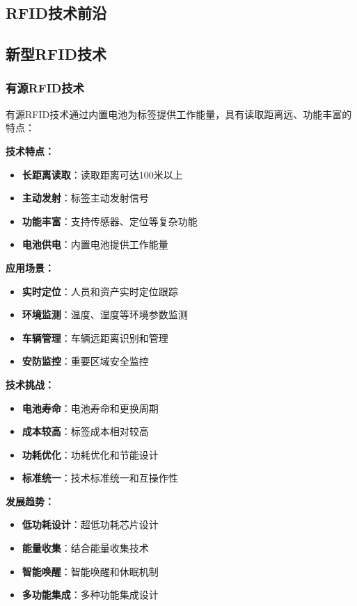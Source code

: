 \documentclass[12pt,UTF8]{ctexbook}
\begin{document}
\begin{itemize}[leftmargin=3.5em]
\begin{itemize}[leftmargin=3.5em]
\begin{itemize}[leftmargin=3.5em]
\begin{itemize}[leftmargin=3.5em]
\part{RFID技术前沿}

\chapter{新型RFID技术}

\section{有源RFID技术}

有源RFID技术通过内置电池为标签提供工作能量，具有读取距离远、功能丰富的特点：

\textbf{技术特点：}
\begin{itemize}[leftmargin=3.5em]
    \item \textbf{长距离读取}：读取距离可达100米以上
    \item \textbf{主动发射}：标签主动发射信号
    \item \textbf{功能丰富}：支持传感器、定位等复杂功能
    \item \textbf{电池供电}：内置电池提供工作能量
\end{itemize}

\textbf{应用场景：}
\begin{itemize}[leftmargin=3.5em]
    \item \textbf{实时定位}：人员和资产实时定位跟踪
    \item \textbf{环境监测}：温度、湿度等环境参数监测
    \item \textbf{车辆管理}：车辆远距离识别和管理
    \item \textbf{安防监控}：重要区域安全监控
\end{itemize}

\textbf{技术挑战：}
\begin{itemize}[leftmargin=3.5em]
    \item \textbf{电池寿命}：电池寿命和更换周期
    \item \textbf{成本较高}：标签成本相对较高
    \item \textbf{功耗优化}：功耗优化和节能设计
    \item \textbf{标准统一}：技术标准统一和互操作性
\end{itemize}

\textbf{发展趋势：}
\begin{itemize}[leftmargin=3.5em]
    \item \textbf{低功耗设计}：超低功耗芯片设计
    \item \textbf{能量收集}：结合能量收集技术
    \item \textbf{智能唤醒}：智能唤醒和休眠机制
    \item \textbf{多功能集成}：多种功能集成设计
\end{itemize}


\end{itemize}
\end{itemize}
\end{itemize}
\end{itemize}
\end{document}
